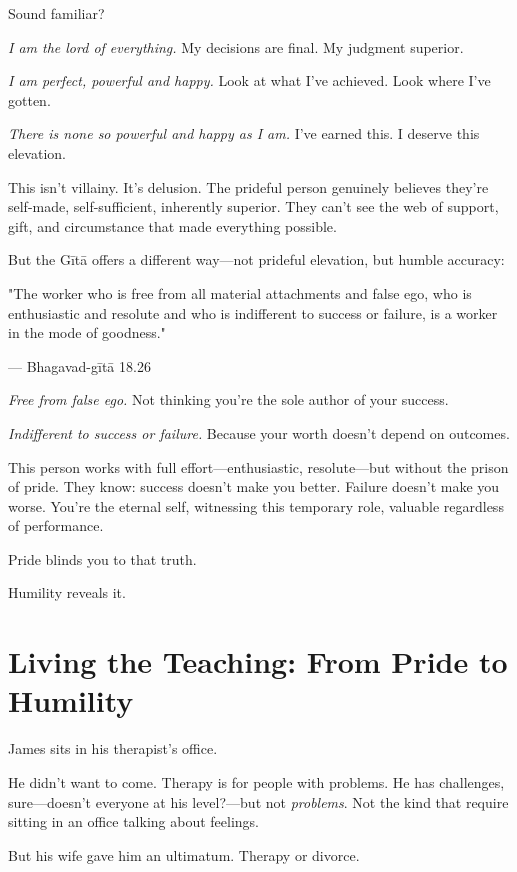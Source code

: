 \documentclass[11pt,twoside]{book}
\begin{document}
Sound familiar?

\emph{I am the lord of everything.} My decisions are final. My judgment superior.

\emph{I am perfect, powerful and happy.} Look at what I've achieved. Look where I've gotten.

\emph{There is none so powerful and happy as I am.} I've earned this. I deserve this elevation.

This isn't villainy. It's delusion. The prideful person genuinely believes they're self-made, self-sufficient, inherently superior. They can't see the web of support, gift, and circumstance that made everything possible.

But the Gītā offers a different way—not prideful elevation, but humble accuracy:

\begin{pullquote}
"The worker who is free from all material attachments and false ego, who is enthusiastic and resolute and who is indifferent to success or failure, is a worker in the mode of goodness."

--- Bhagavad-gītā 18.26
\end{pullquote}

\emph{Free from false ego.} Not thinking you're the sole author of your success.

\emph{Indifferent to success or failure.} Because your worth doesn't depend on outcomes.

This person works with full effort—enthusiastic, resolute—but without the prison of pride. They know: success doesn't make you better. Failure doesn't make you worse. You're the eternal self, witnessing this temporary role, valuable regardless of performance.

Pride blinds you to that truth.

Humility reveals it.

\section*{Living the Teaching: From Pride to Humility}

James sits in his therapist's office.

He didn't want to come. Therapy is for people with problems. He has challenges, sure—doesn't everyone at his level?—but not \emph{problems}. Not the kind that require sitting in an office talking about feelings.

But his wife gave him an ultimatum. Therapy or divorce.
\end{document}
